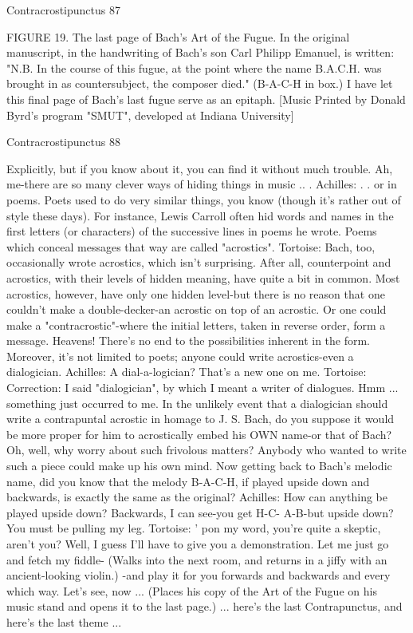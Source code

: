 Contracrostipunctus                                                                           87

FIGURE 19. The last page of Bach's Art of the Fugue. In the original manuscript, in the
handwriting of Bach's son Carl Philipp Emanuel, is written: "N.B. In the course of this
fugue, at the point where the name B.A.C.H. was brought in as countersubject, the
composer died." (B-A-C-H in box.) I have let this final page of Bach's last fugue serve as
an epitaph.
[Music Printed by Donald Byrd's program "SMUT", developed at Indiana University]




Contracrostipunctus                                                                    88

Explicitly, but if you know about it, you can find it without much trouble. Ah, me-there
       are so many clever ways of hiding things in music .. .
Achilles: . . or in poems. Poets used to do very similar things, you know (though it's
       rather out of style these days). For instance, Lewis Carroll often hid words and
       names in the first letters (or characters) of the successive lines in poems he wrote.
       Poems which conceal messages that way are called "acrostics".
Tortoise: Bach, too, occasionally wrote acrostics, which isn't surprising. After all,
       counterpoint and acrostics, with their levels of hidden meaning, have quite a bit in
       common. Most acrostics, however, have only one hidden level-but there is no
       reason that one couldn't make a double-decker-an acrostic on top of an acrostic.
       Or one could make a "contracrostic"-where the initial letters, taken in reverse
       order, form a message. Heavens! There's no end to the possibilities inherent in the
       form. Moreover, it's not limited to poets; anyone could write acrostics-even a
       dialogician.
Achilles: A dial-a-logician? That's a new one on me.
Tortoise: Correction: I said "dialogician", by which I meant a writer of dialogues. Hmm
       ... something just occurred to me. In the unlikely event that a dialogician should
       write a contrapuntal acrostic in homage to J. S. Bach, do you suppose it would be
       more proper for him to acrostically embed his OWN name-or that of Bach? Oh,
       well, why worry about such frivolous matters? Anybody who wanted to write
       such a piece could make up his own mind. Now getting back to Bach's melodic
       name, did you know that the melody B-A-C-H, if played upside down and
       backwards, is exactly the same as the original?
Achilles: How can anything be played upside down? Backwards, I can see-you get H-C-
       A-B-but upside down? You must be pulling my leg.
Tortoise: ' pon my word, you're quite a skeptic, aren't you? Well, I guess I'll have to give
       you a demonstration. Let me just go and fetch my fiddle- (Walks into the next
       room, and returns in a jiffy with an ancient-looking violin.) -and play it for you
       forwards and backwards and every which way. Let's see, now ... (Places his copy
       of the Art of the Fugue on his music stand and opens it to the last page.) ... here's
       the last Contrapunctus, and here's the last theme ...


